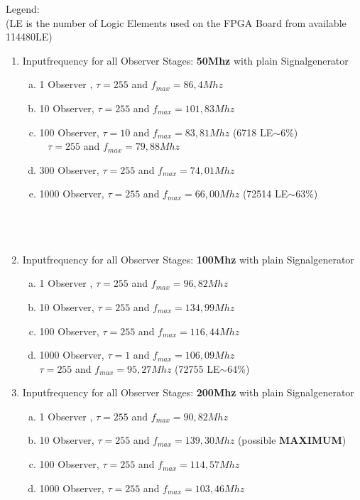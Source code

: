 Legend:\\
(LE is the number of Logic Elements used on the FPGA Board from available 114480LE)
\begin{enumerate}[(1)]
\item Inputfrequency for all Observer Stages: \textbf{50Mhz}
 with plain Signalgenerator
  \begin{enumerate}[a)]
    \item 1 Observer , $\tau = 255$ and $f_{max} = 86,4Mhz$
    \item 10 Observer, $\tau = 255$ and $f_{max} = 101,83Mhz$
    \item 100 Observer, $\tau = 10$ and $f_{max} = 83,81Mhz$  (6718 LE$\sim$6\%)\\
      $\;\;\;\tau = 255$ and $f_{max} = 79,88Mhz$
    \item 300 Observer, $\tau = 255$ and $f_{max} = 74,01Mhz$ 
    \item 1000 Observer, $\tau = 255$ and $f_{max} = 66,00Mhz$ (72514 LE$\sim$63\%)\\\\\\\\
  \end{enumerate}


\item Inputfrequency for all Observer Stages: \textbf{100Mhz}
 with plain Signalgenerator
  \begin{enumerate}[a)]
    \item 1 Observer , $\tau = 255$ and $f_{max} = 96,82Mhz$
    \item 10 Observer, $\tau = 255$ and $f_{max} = 134,99Mhz$
    \item 100 Observer, $\tau = 255$ and $f_{max} = 116,44Mhz$
    \item 1000 Observer, $\tau = 1$ and $f_{max} = 106,09Mhz$ \\
    $\tau = 255$ and $f_{max} = 95,27Mhz$ (72755 LE$\sim$64\%)
  \end{enumerate}


\item Inputfrequency for all Observer Stages: \textbf{200Mhz}
 with plain Signalgenerator
  \begin{enumerate}[a)]
    \item 1 Observer , $\tau = 255$ and $f_{max} = 90,82Mhz$
    \item 10 Observer, $\tau = 255$ and $f_{max} = 139,30Mhz$ (possible \textbf{MAXIMUM})
    \item 100 Observer, $\tau = 255$ and $f_{max} = 114,57Mhz$
    \item 1000 Observer, $\tau = 255$ and $f_{max} = 103,46Mhz$
  \end{enumerate}
\end{enumerate}


